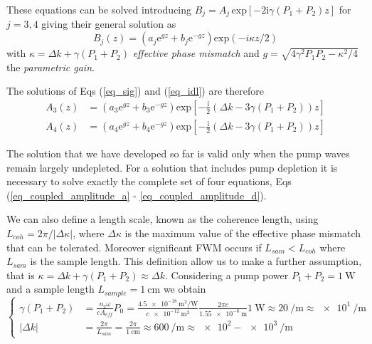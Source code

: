 \documentclass[12pt,a4paper,twoside]{article}
\begin{document}
These equations can be solved introducing $B_j = A_j \,\mathrm{exp}[-2\mathrm{i}\gamma(P_1+P_2)z]$ for $j=3,4$ giving their general solution as
\begin{equation*}
	B_j(z) = (a_j\mathrm{e}^{gz}+b_j\mathrm{e}^{-gz})\mathrm{exp}(-i\kappa z/2)
\end{equation*}
with $\kappa = \Delta k + \gamma(P_1 + P_2)$ \textit{effective phase mismatch} and $g = \sqrt{4\gamma^2P_1P_2 - \kappa^2/4}$ the \textit{parametric gain}.

The solutions of Eqs (\ref{eq_sig}) and (\ref{eq_idl}) are therefore
\begin{subequations}
\begin{align}
	A_3(z) &= \left(a_3\mathrm{e}^{gz}+b_3\mathrm{e}^{-gz}\right)\mathrm{exp}\left[-\frac{\mathrm{i}}{2}(\Delta k -3\gamma(P_1 + P_2))z\right]
		\label{eq_sig_sol} \\
	A_4(z) &= \left(a_4\mathrm{e}^{gz}+b_4\mathrm{e}^{-gz}\right)\mathrm{exp}\left[-\frac{\mathrm{i}}{2}(\Delta k -3\gamma(P_1 + P_2))z\right]	
		\label{eq_idl_sol}
\end{align}
\end{subequations}

The solution that we have developed so far is valid only when the pump waves remain largely undepleted.
For a solution that includes pump depletion it is necessary to solve exactly the complete set of four equations, Eqs (\ref{eq_coupled_amplitude_a} - \ref{eq_coupled_amplitude_d}).

We can also define a length scale, known as the coherence length, using $L_{coh} = 2\pi/|\Delta\kappa|$, where $\Delta\kappa$ is the maximum value of the effective phase mismatch that can be tolerated.
Moreover significant FWM occurs if $L_{sam}<L_{coh}$ where $L_{sam}$ is the sample length.
This definition allow us to make a further assumption, that is $\kappa = \Delta k + \gamma(P_1 + P_2) \approx \Delta k$.
Considering a pump power $P_1+P_2 = \SI{1}{\W}$ and a sample length $L_{sample} = \SI{1}{\cm}$ we obtain
\begin{equation*}
\left\{
 	\begin{aligned}
		\gamma(P_1 + P_2) &= \frac{n_2\omega}{cA_{eff}}P_0 = \frac{\SI{4.5e-18}{\m^2\per\W}}{c\SI{e-12}{\m^2}}\frac{2\pi c}{\SI{1.55e-6}{\m}}\SI{1}{\W} \approx \SI{20}{\per\m} \approx \SI{e1}{\per\m}\\
		|\Delta k |&= \frac{2\pi}{L_{sam}} = \frac{2\pi}{\SI{1}{\cm}} \approx \SI{600}{\per\m} \approx \num{e2} - \SI{e3}{\per\m}
	\end{aligned}
\right.
\label{eq_f&pmc}
\end{equation*}
\end{document}
